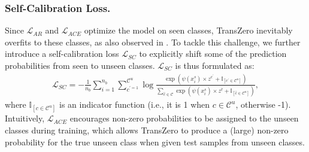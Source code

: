 \documentclass[letterpaper]{article} %
\begin{document}
	\subsubsection{Self-Calibration Loss.}
	Since $\mathcal{L}_{AR}$ and $\mathcal{L}_{ACE}$ optimize the model on seen classes, TransZero inevitably overfits to these classes, as also observed in \cite{Zhu2019SemanticGuidedML,Huynh2020FineGrainedGZ,Xu2020AttributePN}. To tackle this challenge, we further introduce a self-calibration loss $\mathcal{L}_{SC}$ to explicitly shift some of the prediction probabilities from seen to unseen classes. $\mathcal{L}_{SC}$ is thus formulated as:
	\begin{gather}
	\label{eq:L_SC}
	\mathcal{L}_{SC}=-\frac{1}{n_{b}} \sum_{i=1}^{n_{b}}   \sum_{c^{\prime=1}}^{\mathcal{C}^u} \log \frac{\exp \left(\psi(x_i^s) \times z^{c^{\prime}} + \mathbb {I}_{\left[c^{\prime}\in\mathcal{C}^u\right]}\right)}{\sum_{\hat{c} \in \mathcal{C}} \exp \left(\psi(x_i^s) \times z^{\hat{c}} + \mathbb {I}_{\left[\hat{c}\in\mathcal{C}^u\right]}\right)},
	\end{gather}
	where $\mathbb {I}_{\left[c\in \mathcal{C}^u\right]}$ is an indicator function (i.e., it is 1 when $c\in\mathcal{C}^u$, otherwise -1). Intuitively, $\mathcal{L}_{ACE}$ encourages non-zero probabilities to be assigned to the unseen classes during training, which allows TransZero to produce a (large) non-zero probability for the true unseen class when given test samples from unseen classes. 
	
\end{document}
